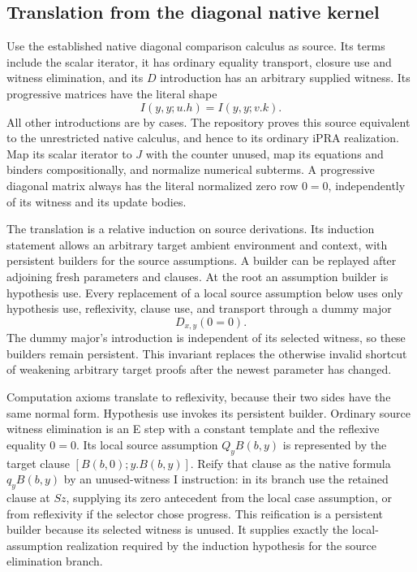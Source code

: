 \documentclass[11pt]{article}
\theoremstyle{definition}\newtheorem{definition}[theorem]{Definition}
\theoremstyle{remark}\newtheorem{remark}[theorem]{Remark}
\begin{document}
\subsection{Translation from the diagonal native kernel}

Use the established native diagonal comparison calculus as source.
Its terms include the scalar iterator, it has ordinary equality transport,
closure use and witness elimination, and its $D$ introduction has an
arbitrary supplied witness.  Its progressive matrices have the literal
shape
\[
                   I(y,y;u.h)=I(y,y;v.k).
\]
All other introductions are by cases.  The repository proves this source
equivalent to the unrestricted native calculus, and hence to its ordinary
iPRA realization.  Map its scalar iterator to $J$ with the counter unused,
map its equations and binders compositionally, and normalize numerical
subterms.  A progressive diagonal matrix always has the literal normalized
zero row $0=0$, independently of its witness and its update bodies.

The translation is a relative induction on source derivations.  Its
induction statement allows an arbitrary target ambient environment and
context, with persistent builders for the source assumptions.  A builder
can be replayed after adjoining fresh parameters and clauses.  At the
root an assumption builder is hypothesis use.  Every replacement of a
local source assumption below uses only hypothesis use, reflexivity,
clause use, and transport through a dummy major
\[
                              D_{x,y}(0=0).
\]
The dummy major's introduction is independent of its selected witness,
so these builders remain persistent.  This invariant replaces the
otherwise invalid shortcut of weakening arbitrary target proofs after
the newest parameter has changed.

Computation axioms translate to reflexivity, because their two sides
have the same normal form.  Hypothesis use invokes its persistent builder.
Ordinary source witness elimination is an E step with a constant template
and the reflexive equality $0=0$.  Its local source assumption $Q_yB(b,y)$
is represented by the target clause $[B(b,0);y.B(b,y)]$.  Reify that clause
as the native formula $q_yB(b,y)$ by an unused-witness I instruction:
in its branch use the retained clause at $Sz$, supplying its zero antecedent
from the local case assumption, or from reflexivity if the selector chose
progress.  This reification is a persistent builder because its selected
witness is unused.  It supplies exactly the local-assumption realization
required by the induction hypothesis for the source elimination branch.
\end{document}
